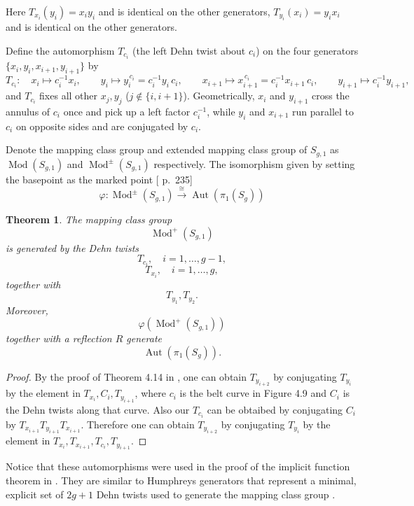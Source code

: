 \documentclass{article}
\newtheorem{theorem}{Theorem}[section]
\newcommand{\conj}[2]{#1^{-1}#2\,#1}  %
\newcommand{\inv}{^{-1}}
\begin{document}
Here  $T_{x _i}(y_i)=x_iy_i$ and is identical on the other generators,   $T_{y _i}(x_i)=y_ix_i$ and is identical on the other generators.


Define the automorphism $T_{c_i}$ (the left Dehn twist about $c_i$) on the four
generators $\{x_i,y_i,x_{i+1},y_{i+1}\}$ by
\begin{equation}\label{eq:phi-def}
T_{c_i}:\quad
x_i\mapsto c_i\inv x_i,\qquad
y_i\mapsto y_i^{\,c_i}=\conj{c_i}{y_i},\qquad
x_{i+1}\mapsto x_{i+1}^{\,c_i}=\conj{c_i}{x_{i+1}},\qquad
y_{i+1}\mapsto c_i\inv y_{i+1},
\end{equation}
and $T_{c_i}$ fixes all other $x_j,y_j$ ($j\notin\{i,i{+}1\}$).
Geometrically, $x_i$ and $y_{i+1}$ cross the annulus of $c_i$ once and pick up a
left factor $c_i\inv$, while $y_i$ and $x_{i+1}$ run parallel to $c_i$ on
opposite sides and are conjugated by $c_i$.

  Denote the mapping class
group and extended mapping class group of $S_{g,1}$ as
$\operatorname{Mod}(S_{g,1})$ and $\operatorname{Mod}^{\pm}(S_{g,1})$
respectively.  
The
isomorphism given by setting the basepoint as the marked point
[\cite{FM} p.~235]
\[
  \varphi : \operatorname{Mod}^{\pm}(S_{g,1})
  \xrightarrow{\ \cong\ }
  \operatorname{Aut}(\pi_{1}(S_g))
\]
\begin{theorem}
The mapping class group
\[
\operatorname{Mod}^{+}(S_{g,1})
\]
is generated by the Dehn twists
\[
T_{c_i}, \quad i=1,\dots,g-1,
\]
\[
T_{x_i}, \quad i=1,\dots,g,
\]
together with
\[
T_{y_1},T_{y_2}.
\]
Moreover,
\[
\varphi(\operatorname{Mod}^{+}(S_{g,1}))
\]
together with a reflection \(R\) generate
\[
\operatorname{Aut}(\pi_1(S_g)).
\]
\end{theorem}
\begin{proof}  By the proof of Theorem 4.14 in \cite{FM},  one can obtain $T_{y_{i+2}}$ by conjugating $T_{y_i}$ by the element  in $T_{x_i}, C_i, T_{y_{i+1}}$, where $c_i$ is the belt curve in Figure 4.9 \cite{FM} and $C_i$ is the Dehn twists along that curve.  Also our $T_{c_i}$ can be obtaibed by conjugating $C_i$ by $T_{x_{i+1}} T_{y_{i+1}} T_{x_{i+1}} $. Therefore one can obtain $T_{y_{i+2}}$ by conjugating $T_{y_i}$ by the element  in $T_{x_i}, T_{x_{i+1}},T_{c_i}, T_{y_{i+1}}$. 
\end{proof}

Notice that these automorphisms were used in the proof of the implicit function theorem in \cite{Imp}. They are similar to Humphreys generators that represent a minimal, explicit set of $2g+1$ Dehn twists used to generate the mapping class group \cite{FM}.
\end{document}
